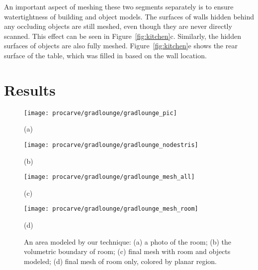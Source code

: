 \documentclass[12pt,onecolumn,oneside]{book}
\begin{document}
An important aspect of meshing these two segments separately is to ensure watertightness of building and object models.  The surfaces of walls hidden behind any occluding objects are still meshed, even though they are never directly scanned.  This effect can be seen in Figure~\ref{fig:kitchen}c.  Similarly, the hidden surfaces of objects are also fully meshed.  Figure~\ref{fig:kitchen}e shows the rear surface of the table, which was filled in based on the wall location.

\FloatBarrier
\section{Results}
\label{sec:procarve_results}

\begin{figure}[t]
	\begin{minipage}[c]{0.49\linewidth}
		\centerline{\texttt{[image: procarve/gradlounge/gradlounge\_pic]}}
		\centerline{(a)}
	\end{minipage}
	\hfill
	\begin{minipage}[c]{0.49\linewidth}
		\centerline{\texttt{[image: procarve/gradlounge/gradlounge\_nodestris]}}
		\centerline{(b)}
	\end{minipage}
	
	\begin{minipage}[c]{0.49\linewidth}
		\centerline{\texttt{[image: procarve/gradlounge/gradlounge\_mesh\_all]}}
		\centerline{(c)}
	\end{minipage}
	\hfill
	\begin{minipage}[c]{0.49\linewidth}
		\centerline{\texttt{[image: procarve/gradlounge/gradlounge\_mesh\_room]}}
		\centerline{(d)}
	\end{minipage}

	\caption[Surface Reconstruction of small room.]{An area modeled by our technique: (a) a photo of the room; (b) the volumetric boundary of room; (c) final mesh with room and objects modeled; (d) final mesh of room only, colored by planar region.}
	\label{fig:procarve_gradlounge}
\end{figure}
\end{document}
